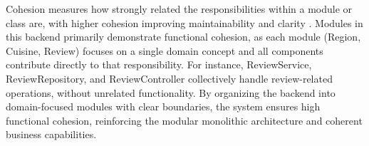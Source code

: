 Cohesion measures how strongly related the responsibilities within a module or class are, 
with higher cohesion improving maintainability and clarity \cite{GeeksforGeeks_2025}. 
Modules in this backend primarily demonstrate functional cohesion, 
as each module (Region, Cuisine, Review) focuses on a single domain concept and 
all components contribute directly to that responsibility. 
For instance, ReviewService, ReviewRepository, and ReviewController collectively 
handle review-related operations, without unrelated functionality.
By organizing the backend into domain-focused modules with clear boundaries, 
the system ensures high functional cohesion, 
reinforcing the modular monolithic architecture and coherent business capabilities.

\classFigure